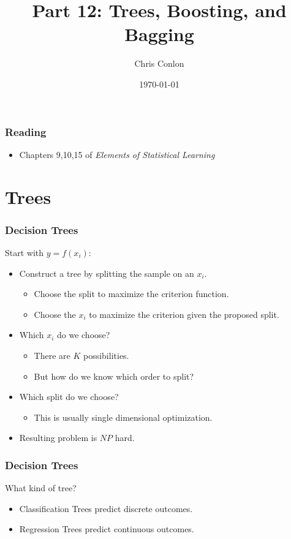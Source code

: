 \documentclass[xcolor=pdftex,dvipsnames,table,mathserif,aspectratio=169]{beamer}
\begin{document}
\title{Part 12: Trees, Boosting, and Bagging}
\author{Chris Conlon}
\date{\today}

\frame{\titlepage}


\begin{frame}
\frametitle{Reading}
\begin{itemize}
\item Chapters 9,10,15 of \textit{Elements of Statistical Learning}
\end{itemize}
\end{frame}



\section{Trees}
\begin{frame}
\frametitle{Decision Trees}
Start with $y = f(x_i)$:
\begin{itemize}
\item Construct a \alert{tree} by \alert{splitting} the sample on an $x_i$.
\begin{itemize}
\item Choose the split to maximize the criterion function.
\item Choose the $x_i$ to maximize the criterion given the proposed split.
\end{itemize}
\item Which $x_i$ do we choose?
\begin{itemize}
\item There are $K$ possibilities. 
\item But how do we know which order to split?
\end{itemize}
\item Which split do we choose?
\begin{itemize}
\item This is usually single dimensional optimization.
\end{itemize}
\item Resulting problem is $NP$ hard.
\end{itemize}
\end{frame}

\begin{frame}
\frametitle{Decision Trees}
What kind of tree?
\begin{itemize}
\item \alert{Classification} Trees predict \alert{discrete} outcomes.
\item \alert{Regression} Trees predict \alert{continuous} outcomes.
\end{itemize}
\end{frame}
\end{document}
